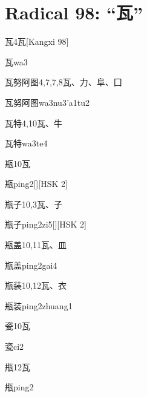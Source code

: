 
\section*{Radical 98: ``⽡''}

\begin{entry}{瓦}{4}{⽡}[Kangxi 98]
  \begin{phonetics}{瓦}{wa3}
  \end{phonetics}
\end{entry}

\begin{entry}{瓦努阿图}{4,7,7,8}{⽡、⼒、⾩、⼞}
  \begin{phonetics}{瓦努阿图}{wa3nu3'a1tu2}
  \end{phonetics}
\end{entry}

\begin{entry}{瓦特}{4,10}{⽡、⽜}
  \begin{phonetics}{瓦特}{wa3te4}
  \end{phonetics}
\end{entry}

\begin{entry}{瓶}{10}{⽡}
  \begin{phonetics}{瓶}{ping2}[][HSK 2]
  \end{phonetics}
\end{entry}

\begin{entry}{瓶子}{10,3}{⽡、⼦}
  \begin{phonetics}{瓶子}{ping2zi5}[][HSK 2]
  \end{phonetics}
\end{entry}

\begin{entry}{瓶盖}{10,11}{⽡、⽫}
  \begin{phonetics}{瓶盖}{ping2gai4}
  \end{phonetics}
\end{entry}

\begin{entry}{瓶装}{10,12}{⽡、⾐}
  \begin{phonetics}{瓶装}{ping2zhuang1}
  \end{phonetics}
\end{entry}

\begin{entry}{瓷}{10}{⽡}
  \begin{phonetics}{瓷}{ci2}
  \end{phonetics}
\end{entry}

\begin{entry}{甁}{12}{⽡}
  \begin{phonetics}{甁}{ping2}
  \end{phonetics}
\end{entry}


